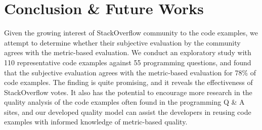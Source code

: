 \documentclass[conference]{IEEEtran}
\begin{document}
\section{Conclusion \& Future Works\vspace{-.1cm}}
\label{sec:conclusion}
Given the growing interest of StackOverflow community to the code examples, we attempt to determine whether their subjective evaluation by the community agrees with the metric-based evaluation. We conduct an exploratory study with 110 representative code examples against 55 programming questions, and found that the subjective evaluation agrees with the metric-based evaluation for 78\% of code examples. The finding is quite promising, and it reveals the effectiveness of StackOverflow votes. It also has the potential to encourage more research in the quality analysis of the code examples often found in the programming Q \& A sites, and our developed quality model can assist the developers in reusing code examples with informed knowledge of metric-based quality. 
\vspace{-.2cm}


\setlength{\bibsep}{0pt plus 0.3ex}
\scriptsize
%
%
\end{document}
